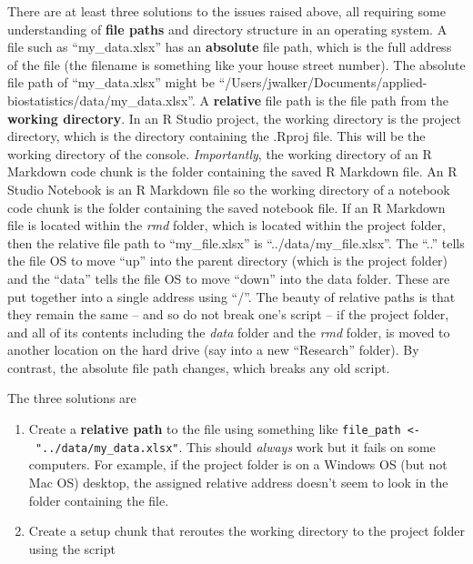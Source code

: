 \documentclass[]{book}
\providecommand{\tightlist}{%
  \setlength{\itemsep}{0pt}\setlength{\parskip}{0pt}}
\begin{document}
There are at least three solutions to the issues raised above, all requiring some understanding of \textbf{file paths} and directory structure in an operating system. A file such as ``my\_data.xlsx'' has an \textbf{absolute} file path, which is the full address of the file (the filename is something like your house street number). The absolute file path of ``my\_data.xlsx'' might be ``/Users/jwalker/Documents/applied-biostatistics/data/my\_data.xlsx''. A \textbf{relative} file path is the file path from the \textbf{working directory}. In an R Studio project, the working directory is the project directory, which is the directory containing the .Rproj file. This will be the working directory of the console. \emph{Importantly}, the working directory of an R Markdown code chunk is the folder containing the saved R Markdown file. An R Studio Notebook is an R Markdown file so the working directory of a notebook code chunk is the folder containing the saved notebook file. If an R Markdown file is located within the \emph{rmd} folder, which is located within the project folder, then the relative file path to ``my\_file.xlsx'' is ``../data/my\_file.xlsx''. The ``..'' tells the file OS to move ``up'' into the parent directory (which is the project folder) and the ``data'' tells the file OS to move ``down'' into the data folder. These are put together into a single address using ``/''. The beauty of relative paths is that they remain the same -- and so do not break one's script -- if the project folder, and all of its contents including the \emph{data} folder and the \emph{rmd} folder, is moved to another location on the hard drive (say into a new ``Research'' folder). By contrast, the absolute file path changes, which breaks any old script.

The three solutions are

\begin{enumerate}
\def\labelenumi{\arabic{enumi}.}
\tightlist
\item
  Create a \textbf{relative path} to the file using something like \texttt{file\_path\ \textless{}-\ "../data/my\_data.xlsx"}. This should \emph{always} work but it fails on some computers. For example, if the project folder is on a Windows OS (but not Mac OS) desktop, the assigned relative address doesn't seem to look in the folder containing the file.
\item
  Create a setup chunk that reroutes the working directory to the project folder using the script
\end{enumerate}
\end{document}
